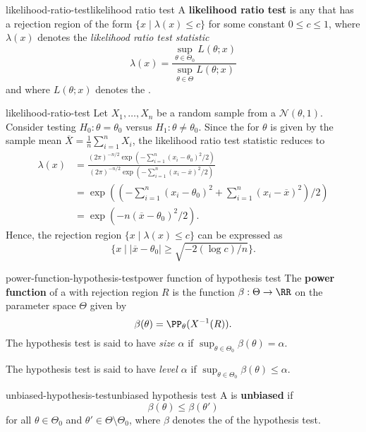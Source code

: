 \begin{topic}{likelihood-ratio-test}{likelihood ratio test}
    A \textbf{likelihood ratio test} is any  that has a rejection region of the form $\{ x \mid \lambda(x) \le c \}$ for some constant $0 \le c \le 1$, where $\lambda(x)$ denotes the \textit{likelihood ratio test statistic}
    \[ \lambda(x) = \frac{\sup_{\theta \in \Theta_0} L(\theta; x)}{\sup_{\theta \in \Theta} L(\theta; x)} \]
    and where $L(\theta; x)$ denotes the .
\end{topic}

\begin{example}{likelihood-ratio-test}
    Let $X_1, \ldots, X_n$ be a random sample from a  $\mathcal{N}(\theta, 1)$. Consider testing $H_0 : \theta = \theta_0$ versus $H_1 : \theta \ne \theta_0$.
    Since the  for $\theta$ is given by the sample mean $\overline{X} = \frac{1}{n} \sum_{i = 1}^{n} X_i$, the likelihood ratio test statistic reduces to
    \[ \begin{aligned}
        \lambda(x) &= \frac{(2 \pi)^{-n/2} \exp \left( - \sum_{i = 1}^{n} (x_i - \theta_0)^2 / 2 \right)}{(2 \pi)^{-n/2} \exp \left( - \sum_{i = 1}^{n} (x_i - \overline{x})^2 / 2 \right)} \\
        &= \exp \left( \left( - \sum_{i = 1}^{n} (x_i - \theta_0)^2 + \sum_{i = 1}^{n} (x_i - \overline{x})^2 \right) / 2 \right) \\ 
        &= \exp \left( - n (\overline{x} - \theta_0)^2 / 2 \right) .
    \end{aligned} \]
    Hence, the rejection region $\{ x \mid \lambda(x) \le c \}$ can be expressed as
    \[ \{ x \mid |\overline{x} - \theta_0| \ge \sqrt{- 2 (\log c) / n} \} . \]
\end{example}

\begin{topic}{power-function-hypothesis-test}{power function of hypothesis test}
    The \textbf{power function} of a  with rejection region $R$ is the function $\beta : \Theta \to \RR$ on the parameter space $\Theta$ given by
    \[ \beta(\theta) = \PP_\theta(X^{-1}(R)) . \]
    The hypothesis test is said to have \textit{size $\alpha$} if $\sup_{\theta \in \Theta_0} \beta(\theta) = \alpha$.

    The hypothesis test is said to have \textit{level $\alpha$} if $\sup_{\theta \in \Theta_0} \beta(\theta) \le \alpha$.
\end{topic}

\begin{topic}{unbiased-hypothesis-test}{unbiased hypothesis test}
    A  is \textbf{unbiased} if
    \[ \beta(\theta) \le \beta(\theta') \]
    for all $\theta \in \Theta_0$ and $\theta' \in \Theta \setminus \Theta_0$, where $\beta$ denotes the  of the hypothesis test.
\end{topic}
